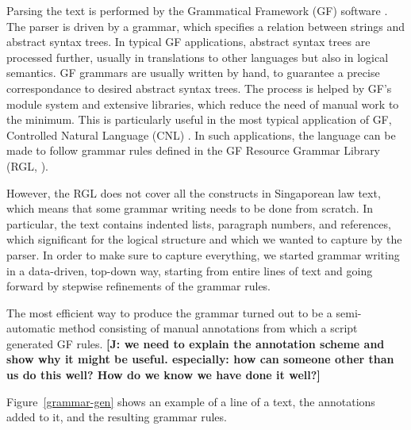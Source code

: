 \documentclass{IOS-Book-Article}
\newcommand{\todoj}[1]{{\color{red}\textbf{[J: #1]}}}
\begin{document}
Parsing the text is performed by the Grammatical Framework (GF) software \cite{ranta-2011}.
The parser is driven by a grammar, which specifies a relation between strings and abstract syntax trees. In typical GF applications, abstract syntax trees are processed further, usually in translations to other languages but also in logical semantics. GF grammars are usually written by hand, to guarantee a precise correspondance to desired abstract syntax trees. The process is helped by GF's module system and extensive libraries, which reduce the need of manual work to the minimum. This is particularly useful in the most typical application of GF, Controlled Natural Language (CNL) \cite{fuchs-al-2008,angelov-ranta-2009}. In such applications, the language can be made to follow grammar rules defined in the GF Resource Grammar Library (RGL, \cite{ranta-2009}).

However, the RGL does not cover all the constructs in Singaporean law text, which means that some grammar writing needs to be done from scratch. In particular, the text contains indented lists, paragraph numbers, and references, which significant for the logical structure and which we wanted to capture by the parser. In order to make sure to capture everything, we started grammar writing in a data-driven, top-down way, starting from entire lines of text and going forward by stepwise refinements of the grammar rules.

The most efficient way to produce the grammar turned out to be a semi-automatic method consisting of manual annotations from which a script generated GF rules.
\todoj{we need to explain the annotation scheme and show why it might be useful. especially: how can someone other than us do this well? How do we know we have done it well?}

Figure~\ref{grammar-gen} shows an example of a line of a text, the annotations added to it, and the resulting grammar rules.
\end{document}
